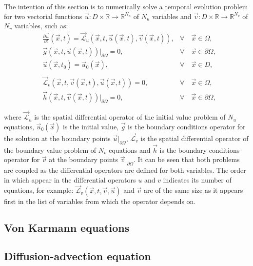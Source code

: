        The intention of this section is to numerically solve a temporal evolution problem for two vectorial functions $\vec{u}: D \times \mathbb{R}\rightarrow \mathbb{R}^{N_u}$ of $N_u$ variables and $\vec{v}: D \times \mathbb{R}\rightarrow \mathbb{R}^{N_v}$ of $N_v$ variables, such as:
       \begin{align*}
       & \frac{\partial \vec{u} }{\partial t}(\vec{x},t) =\vec{\mathcal{L}}_u (\vec{x},t,\vec{u}(\vec{x},t),\vec{v}(\vec{x},t)) ,   & \forall & \ \vec{x} \in  \Omega, \\
       & \vec{g} (\vec{x},t,\vec{u}(\vec{x},t))\big\rvert_{\partial \Omega}=0 , & \forall & \ \vec{x} \in \partial \Omega, \\ 
       & \vec{u}(\vec{x},t_0)=\vec{u}_0(\vec{x}),  & \forall & \ \vec{x} \in  D, \\ \\
       & \vec{\mathcal{L}}_v (\vec{x},t,\vec{v}(\vec{x},t),\vec{u}(\vec{x},t)) = 0 ,  & \forall & \ \vec{x} \in  \Omega, \\
       & \vec{h} (\vec{x},t,\vec{v}(\vec{x},t))\big\rvert_{\partial \Omega}=0 , & \forall & \ \vec{x} \in \partial \Omega,
       \end{align*}
       
       where $\vec{\mathcal{L}}_u$ is the spatial dif{}ferential operator of the initial value problem of $N_u$ equations, $\vec{u}_0(\vec{x})$ is the initial value, $\vec{g}$ is the boundary conditions operator for the solution at the boundary points $\vec{u} \big\rvert_{\partial \Omega}$,  $\vec{\mathcal{L}}_v$ is the spatial dif{}ferential operator of the boundary value problem of $N_v$ equations and $\vec{h}$ is the boundary conditions operator for $\vec{v}$  at the boundary points $\vec{v} \big\rvert_{\partial \Omega}$. It can be seen that both problems are coupled as the dif{}ferential operators are defined for both variables. The order in which appear in the dif{}ferential operators $u$ and $v$ indicates its number of equations, for example: $\vec{\mathcal{L}}_v(\vec{x},t,\vec{v},\vec{u})$ and $\vec{v}$ are of the same size as it appears first in the list of variables from which the operator depends on.
       
       \subsection{Von Karmann equations}
       \subsection{Diffusion-advection equation}
       
 